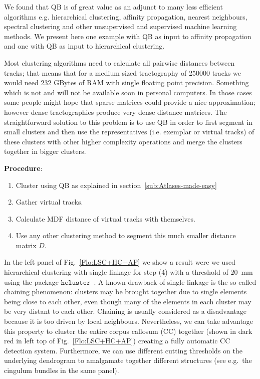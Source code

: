 \documentclass[preprint,authoryear,a4paper,10pt,onecolumn]{elsarticle}
\begin{document}
We found that QB is of great value as an adjunct to many less efficient
algorithms e.g. hierarchical clustering, affinity propagation, nearest
neighbours, spectral clustering and other unsupervised and supervised
machine learning methods. We present here one example with QB as input to
affinity propagation and one with QB as input to hierarchical
clustering.

Most clustering algorithms need to calculate all pairwise distances
between tracks; that means that for a medium sized tractography of
\num{250000} tracks we would need $232$ GBytes of RAM with single floating
point precision. Something which is not and will not be available soon
in personal computers. In those cases some people might hope that sparse
matrices could provide a nice approximation; however dense
tractographies produce very dense distance matrices. The straightforward
solution to this problem is to use QB in order to first segment in small
clusters and then use the representatives (i.e. exemplar or virtual
tracks) of these clusters with other higher complexity operations and
merge the clusters together in bigger clusters.

\textbf{Procedure}:

\begin{enumerate}

\item Cluster using QB as explained in section~\ref{sub:Atlases-made-easy}

\item Gather virtual tracks.

\item Calculate MDF distance of virtual tracks with themselves.

\item Use any other clustering method to segment this much smaller distance
matrix $D$.

\end{enumerate}

In the left panel of Fig.~\ref{Flo:LSC+HC+AP} we show a result were we
used hierarchical clustering with single linkage for step (4) with a
threshold of $20$~mm using the package
$\texttt{hcluster}$~\citep{eads-hcluster-software}. A known drawback of
single linkage is the so-called chaining phenomenon: clusters may be
brought together due to single elements being close to each other, even
though many of the elements in each cluster may be very distant to each
other. Chaining is usually considered as a disadvantage because it is
too driven by local neighbours. Nevertheless, we can take advantage this
property to cluster the entire corpus callosum (CC) together (shown in
dark red in left top of Fig.~\ref{Flo:LSC+HC+AP}) creating a fully
automatic CC detection system.  Furthermore, we can use different
cutting thresholds on the underlying dendrogram to amalgamate together
different structures (see e.g.~the cingulum bundles in the same panel).
\end{document}
